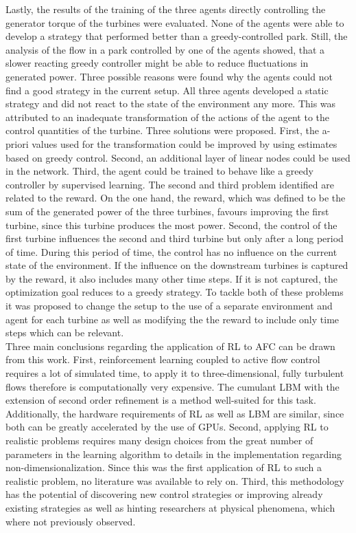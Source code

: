 Lastly, the results of the training of the three agents directly controlling the generator torque of the turbines were evaluated. None of the agents were able to develop a strategy that performed better than a greedy-controlled park. Still, the analysis of the flow in a park controlled by one of the agents showed, that a slower reacting greedy controller might be able to reduce fluctuations in generated power. Three possible reasons were found why the agents could not find a good strategy in the current setup. All three agents developed a static strategy and did not react to the state of the environment any more. This was attributed to an inadequate transformation of the actions of the agent to the control quantities of the turbine. Three solutions were proposed. First, the a-priori values used for the transformation could be improved by using estimates based on greedy control. Second, an additional layer of linear nodes could be used in the network. Third, the agent could be trained to behave like a greedy controller by supervised learning. The second and third problem identified are related to the reward. On the one hand, the reward, which was defined to be the sum of the generated power of the three turbines, favours improving the first turbine, since this turbine produces the most power. Second, the control of the first turbine influences the second and third turbine but only after a long period of time. During this period of time, the control has no influence on the current state of the environment. If the influence on the downstream turbines is captured by the reward, it also includes many other time steps. If it is not captured, the optimization goal reduces to a greedy strategy. To tackle both of these problems it was proposed to change the setup to the use of a separate environment and agent for each turbine as well as modifying the the reward to include only time steps which can be relevant. \\
Three main conclusions regarding the application of RL to AFC can be drawn from this work. First, reinforcement learning coupled to active flow control requires a lot of simulated time, to apply it to three-dimensional, fully turbulent flows therefore is computationally very expensive. The cumulant LBM with the extension of second order refinement is a method well-suited for this task. Additionally, the hardware requirements of RL as well as LBM are similar, since both can be greatly accelerated by the use of GPUs. Second, applying RL to realistic problems requires many design choices from the great number of parameters in the learning algorithm to details in the implementation regarding non-dimensionalization. Since this was the first application of RL to such a realistic problem, no literature was available to rely on. Third, this methodology has the potential of discovering new control strategies or improving already existing strategies as well as hinting researchers at physical phenomena, which where not previously observed. \\
